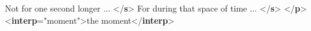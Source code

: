 \begin{shaded}
\hspace*{1em}Not for one second longer ... {</\textbf{s}>}\mbox{}\newline 
{}\mbox{}\newline 
{}For during that space of time ... {</\textbf{s}>}\mbox{}\newline 
{</\textbf{p}>}\mbox{}\newline 
{<\textbf{interp}\hspace*{1em}{xml:id}="{moment}">}the moment{</\textbf{interp}>}\end{shaded}\egroup\par \par
